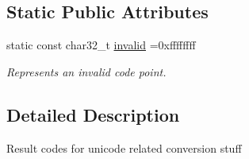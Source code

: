 \subsection*{Static Public Attributes}
\begin{DoxyCompactItemize}
\item 
\hypertarget{classmiosix_1_1_unicode_aa9ff887dca3ef8316219266da562b7ac}{static const char32\-\_\-t \hyperlink{classmiosix_1_1_unicode_aa9ff887dca3ef8316219266da562b7ac}{invalid} =0xffffffff}\label{classmiosix_1_1_unicode_aa9ff887dca3ef8316219266da562b7ac}

\begin{DoxyCompactList}\small\item\em Represents an invalid code point. \end{DoxyCompactList}\end{DoxyCompactItemize}


\subsection{Detailed Description}
Result codes for unicode related conversion stuff 

